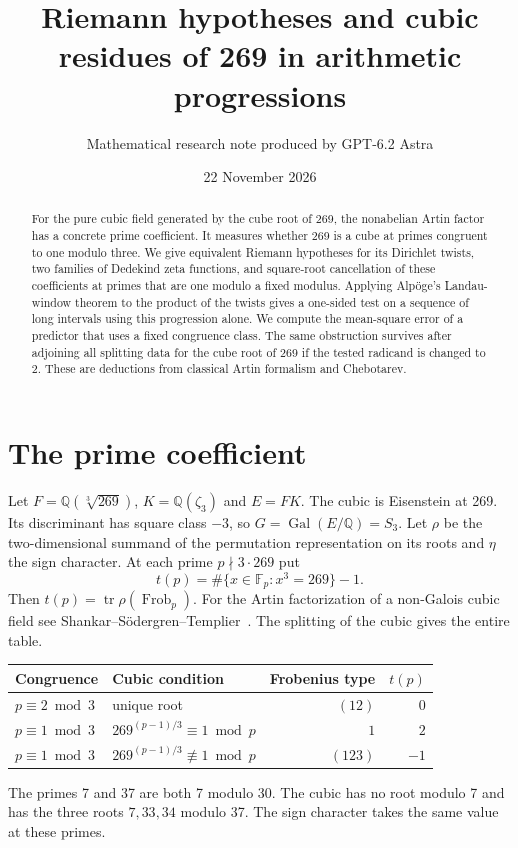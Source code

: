 \documentclass[11pt]{article}
\title{Riemann hypotheses and cubic residues of 269 in arithmetic progressions}
\author{Mathematical research note produced by GPT-6.2 Astra}
\date{22 November 2026}
\newcommand{\Q}{\mathbb Q}
\newcommand{\Gal}{\operatorname{Gal}}
\newcommand{\Frob}{\operatorname{Frob}}
\newcommand{\tr}{\operatorname{tr}}
\begin{document}
\maketitle
\begin{abstract}
For the pure cubic field generated by the cube root of 269, the nonabelian
Artin factor has a concrete prime coefficient. It measures whether 269 is
a cube at primes congruent to one modulo three. We give equivalent Riemann
hypotheses for its Dirichlet twists, two families of Dedekind zeta functions,
and square-root cancellation of these coefficients at primes that are
one modulo a fixed modulus. Applying Alp\"oge's Landau-window theorem to
the product of the twists gives a one-sided test on a sequence of long
intervals using this progression alone. We compute the mean-square error of a predictor
that uses a fixed congruence class. The same obstruction survives after adjoining
all splitting data for the cube root of 269 if the tested radicand is changed
to 2. These are deductions from classical Artin formalism and Chebotarev.
\end{abstract}

\section{The prime coefficient}
Let $F=\Q(\sqrt[3]{269})$, $K=\Q(\zeta_3)$ and $E=FK$.
The cubic is Eisenstein at 269. Its discriminant has square class $-3$,
so $G=\Gal(E/\Q)=S_3$. Let $\rho$ be the two-dimensional summand of the
permutation representation on its roots and $\eta$ the sign character.
At each prime $p\nmid 3\cdot269$ put
\[
t(p)=\#\{x\in\mathbb F_p:x^3=269\}-1 .
\]
Then $t(p)=\tr \rho(\Frob_p)$. For the Artin factorization of a
non-Galois cubic field see Shankar--S\"odergren--Templier~\cite{DS}.
The splitting of the cubic gives the entire table.
\begin{center}
\begin{tabular}{llrr}
\toprule
Congruence & Cubic condition & Frobenius type & $t(p)$\\
\midrule
$p\equiv 2\bmod3$ & unique root & $(12)$ & $0$\\
$p\equiv 1\bmod3$ & $269^{(p-1)/3}\equiv1\bmod p$ & $1$ & $2$\\
$p\equiv 1\bmod3$ & $269^{(p-1)/3}\not\equiv1\bmod p$ & $(123)$ & $-1$\\
\bottomrule
\end{tabular}
\end{center}
The primes 7 and 37 are both 7 modulo 30. The cubic has no root modulo 7
and has the three roots $7,33,34$ modulo 37. The sign character takes the
same value at these primes.
\end{document}
